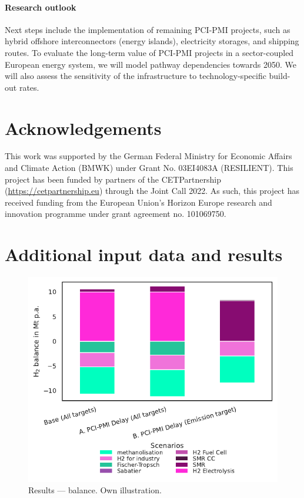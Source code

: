\documentclass[final,5p,times,twocolumn]{elsarticle}
\begin{document}
\paragraph{Research outlook} Next steps include the implementation of remaining PCI-PMI projects, such as hybrid offshore interconnectors (energy islands), electricity storages, and  shipping routes. To evaluate the long-term value of PCI-PMI projects in a sector-coupled European energy system, we will model pathway dependencies towards 2050. We will also assess the sensitivity of the infrastructure to technology-specific build-out rates.


\section*{Acknowledgements}
This work was supported by the German Federal Ministry for Economic Affairs and Climate Action (BMWK) under Grant No. 03EI4083A (RESILIENT). This project has been funded by partners of the CETPartnership (\href{https://cetpartnership.eu}{https://cetpartnership.eu}) through the Joint Call 2022. As such, this project has received funding from the European Union's Horizon Europe research and innovation programme under grant agreement no. 101069750.

 


\appendix
\newpage
\section{Additional input data and results}
\label{sec:app_additional}

\vspace{5cm}
\begin{figure}[h]
  \centering
  \includegraphics[width=0.9\linewidth]{h2_balance}
  \caption{Results ---  balance. Own illustration.}
  \label{fig:h2_balance}
\end{figure}
\end{document}
